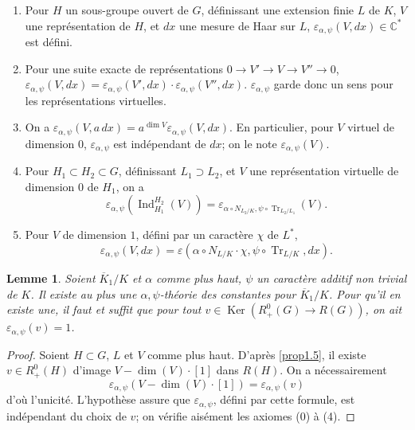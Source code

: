 \documentclass[11pt,a4paper]{amsart}
\theoremstyle{plain}
\newtheorem{lemma}[theorem]{Lemme}
\theoremstyle{definition}
\DeclareMathOperator{\Ind}{Ind}
\DeclareMathOperator{\Ker}{Ker}
\DeclareMathOperator{\Tr}{Tr}
\newcommand{\dbC}{\mathbb{C}}
\def\dim{\mathop{\mathrm{dim}}\nolimits}
\newcommand{\ov}[1]{\overline{#1}}
\newcommand{\eps}{\varepsilon}
\begin{document}
\begin{enumerate}
\item[(0)] Pour $H$ un sous-groupe ouvert de $G$, d\'efinissant une extension finie $L$ de $K$, $V$ une repr\'esentation de $H$, et $dx$ une mesure de Haar sur $L$, $\eps_{\alpha,\psi}(V,dx) \in \dbC^{*}$ est d\'efini.
\item[(1)] Pour une suite exacte de repr\'esentations $0 \to V' \to V \to V'' \to 0$, $\eps_{\alpha,\psi}(V,dx) = \eps_{\alpha,\psi}(V',dx) \cdot \eps_{\alpha,\psi}(V'',dx)$. $\eps_{\alpha,\psi}$ garde donc un sens pour les repr\'esentations virtuelles.
\item[(2)] On a $\eps_{\alpha,\psi}(V,a\,dx) = a^{\dim V} \eps_{\alpha,\psi}(V,dx)$. En particulier, pour $V$ virtuel de dimension $0$, $\eps_{\alpha,\psi}$ est ind\'ependant de $dx$; on le note $\eps_{\alpha,\psi}(V)$.
\item[(3)] Pour $H_{1} \subset H_{2} \subset G$, d\'efinissant $L_{1} \supset L_{2}$, et $V$ une repr\'esentation virtuelle de dimension $0$ de $H_{1}$, on a
\[
\eps_{\alpha,\psi}(\Ind_{H_{1}}^{H_{2}}(V)) = \eps_{\alpha \circ N_{L_{2}/K}, \psi \circ \Tr_{L_{2}/L_{1}}}(V).
\]
\item[(4)] Pour $V$ de dimension $1$, d\'efini par un caract\`ere $\chi$ de $L^{*}$,
\[
\eps_{\alpha,\psi}(V,dx) = \eps(\alpha \circ N_{L/K} \cdot \chi, \psi \circ \Tr_{L/K}, dx).
\]
\end{enumerate}

\begin{lemma}\label{lem4.7}
Soient $\ov{K}_{1}/K$ et $\alpha$ comme plus haut, $\psi$ un caract\`ere additif non trivial de $K$. Il existe au plus une $\alpha,\psi$-th\'eorie des constantes pour $\ov{K}_{1}/K$. Pour qu'il en existe une, il faut et suffit que pour tout $v \in \Ker(R_{+}^{0}(G) \to R(G))$, on ait $\eps_{\alpha,\psi}(v) = 1$.
\end{lemma}

\begin{proof}
Soient $H \subset G$, $L$ et $V$ comme plus haut. D'apr\`es \ref{prop1.5}, il existe $v \in R_{+}^{0}(H)$ d'image $V - \dim(V) \cdot [1]$ dans $R(H)$. On a n\'ecessairement
\begin{equation}\label{eq4.7.1}
\eps_{\alpha,\psi}(V - \dim(V) \cdot [1]) = \eps_{\alpha,\psi}(v)
\end{equation}
d'o\`u l'unicit\'e. L'hypoth\`ese assure que $\eps_{\alpha,\psi}$, d\'efini par cette formule, est ind\'ependant du choix de $v$; on v\'erifie ais\'ement les axiomes (0) \`a (4).
\end{proof}
\end{document}
